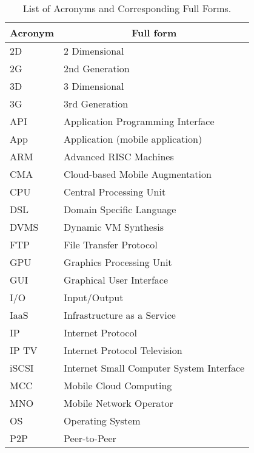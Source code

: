 \documentclass[publish]{IEEEtran}
\begin{document}
\begin{table}[t] 
\caption{List of Acronyms and Corresponding Full Forms.}\label{acronyms}
\small
  \centering
    \begin{tabular}{|l| l|}
    \hline
\multicolumn{1}{|c|}{\textbf{Acronym}}     &  \multicolumn{1}{|c|}{\textbf{Full form}} \bigstrut\\
 \hline
     2D & 2 Dimensional \bigstrut\\
    \hline
     2G   & 2nd Generation   \bigstrut\\
    \hline
     3D   & 3 Dimensional   \bigstrut\\
    \hline
     3G   & 3rd Generation   \bigstrut\\
    \hline
      API & Application Programming Interface \bigstrut\\
    \hline
      App & Application (mobile application) \bigstrut\\
        \hline
     ARM   & Advanced RISC Machines   \bigstrut\\
    \hline
     CMA   & Cloud-based Mobile Augmentation   \bigstrut\\
    \hline
     CPU   & Central Processing Unit   \bigstrut\\
    \hline
     DSL   & Domain Specific Language   \bigstrut\\
    \hline
     DVMS   & Dynamic VM Synthesis   \bigstrut\\
    \hline
     FTP   & File Transfer Protocol   \bigstrut\\
    \hline
      GPU & Graphics Processing Unit \bigstrut\\
    \hline
     GUI   & Graphical User Interface   \bigstrut\\
    \hline
     I/O   & Input/Output   \bigstrut\\
    \hline
     IaaS   & Infrastructure as a Service \bigstrut\\
    \hline
     IP   & Internet Protocol   \bigstrut\\
    \hline
     IP TV   & Internet Protocol Television   \bigstrut\\
    \hline
     iSCSI   & Internet Small Computer System Interface \bigstrut\\
    \hline
     MCC   & Mobile Cloud Computing \bigstrut\\
    \hline
     MNO   & Mobile Network Operator   \bigstrut\\
    \hline
     OS   & Operating System   \bigstrut\\
    \hline
     P2P   & Peer-to-Peer  \bigstrut\\

\end{tabular}
\end{table}
\end{document}
